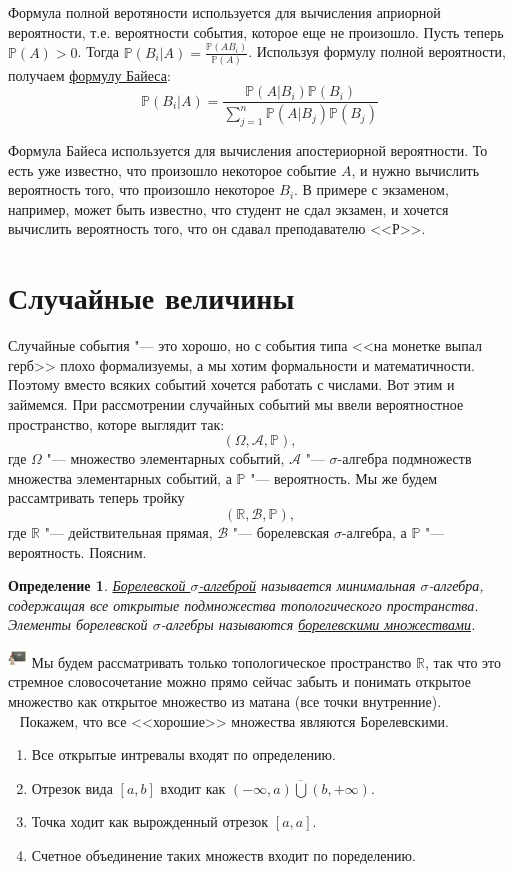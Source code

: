 \documentclass[12pt]{article}
\newtheorem{Def}{Определение}
\newenvironment{Ex}{{\bf Пример}\ }{}
\newenvironment{Wtf}{\includegraphics[height=5mm]{ping}}{}
\numberwithin{Th}{section}
\numberwithin{Def}{section}
\numberwithin{Lem}{section}
\numberwithin{St}{section}
\numberwithin{equation}{section}
\newcommand\Pro{\mathbb{P}}
\newcommand\Ev{\mathscr{A}}
\newcommand\Bor{\mathscr{B}}
\newcommand\Real{\mathbb{R}}
\begin{document}
Формула полной веротяности используется для вычисления априорной вероятности, т.е. вероятности события, которое  еще не произошло.
Пусть теперь \\$\Pro(A) > 0$. Тогда $\Pro(B_i|A)=\frac{\Pro(AB_i)}{\Pro(A)}$. Используя формулу полной вероятности, получаем \underline{формулу Байеса}:
$$\Pro(B_i|A)=\frac{\Pro(A|B_i)\Pro(B_i)}{\sum\limits_{j=1}^n\Pro(A|B_j)\Pro(B_j)}$$

Формула Байеса используется для вычисления апостериорной вероятности. То есть уже известно, что произошло некоторое событие $A$, и нужно вычислить вероятность
того, что произошло некоторое $B_i$. В примере с экзаменом, например, может быть известно, что студент не сдал экзамен, и хочется вычислить вероятность того, что он
сдавал преподавателю <<Р>>.

\newpage
\section{Случайные величины}

\qquad Случайные события "--- это хорошо, но с события типа <<на монетке выпал герб>> плохо формализуемы, а мы хотим формальности и математичности. Поэтому вместо всяких событий хочется работать с числами. Вот этим и займемся. При рассмотрении случайных событий мы ввели вероятностное пространство, которе выглядит так:
$$(\Omega, \Ev, \Pro),$$
где $\Omega$ "--- множество элементарных событий, $\Ev$ "--- $\sigma$-алгебра подмножеств множества элементарных событий, а $\Pro$ "--- вероятность. Мы же будем рассамтривать теперь тройку
$$(\Real, \Bor, \Pro),$$
где $\Real$ "--- действительная прямая, $\Bor$ "--- борелевская $\sigma$-алгебра, а $\Pro$ "--- вероятность. Поясним.

\begin{Def}
\underline{Борелевской $\sigma$-алгеброй} называется минимальная $\sigma$-алгебра, содержащая все открытые подмножества топологического пространства. Элементы борелевской $\sigma$-алгебры называются \underline{борелевскими множествами}.
\end{Def}
\begin{Wtf}
Мы будем рассматривать только топологическое пространство $\Real$, так что это стремное словосочетание можно прямо 
сейчас забыть и понимать открытое множество как открытое множество из матана (все точки внутренние).
\end{Wtf}\\
\begin{Ex}
Покажем, что все <<хорошие>> множества являются Борелевскими.
\begin{enumerate}
\item Все открытые интревалы входят по определению.
\item Отрезок вида $[a, b]$ входит как $\overline{(-\infty, a) \bigcup (b, +\infty)}$.
\item Точка ходит как вырожденный отрезок $[a, a]$.
\item Счетное объединение таких множеств входит по поределению.
\end{enumerate}
\end{Ex}
\end{document}
